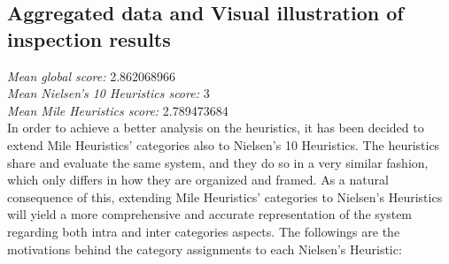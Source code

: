 \graphicspath{ {./root/1.Inspection/res/} }

\subsection{Aggregated data and Visual illustration of inspection results}

\textit{Mean global score:} 2.862068966\\
\textit{Mean Nielsen’s 10 Heuristics score:} 3\\
\textit{Mean Mile Heuristics score:} 2.789473684\\

In order to achieve a better analysis on the heuristics, it has been decided to extend Mile Heuristics’ categories also to Nielsen’s 10 Heuristics. The heuristics share and evaluate the same system, and they do so in a very similar fashion, which only differs in how they are organized and framed. As a natural consequence of this, extending Mile Heuristics’ categories to Nielsen’s Heuristics will yield a more comprehensive and accurate representation of the system regarding both intra and inter categories aspects. The followings are the motivations behind the category assignments to each Nielsen’s Heuristic:

